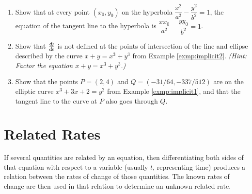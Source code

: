 {\begin{enumerate}[\bfseries 1.]
 \item\label{exer:hyptan} Show that at every point $(x_0,y_0)$ on the hyperbola
  $\dfrac{x^2}{a^2} - \dfrac{y^2}{b^2} = 1$,
  the equation of the  tangent line to the hyperbola is
  $\dfrac{x x_0}{a^2} - \dfrac{y y_0}{b^2} = 1$.
 \item Show that $\frac{d\negmedspace y}{d\!x}$ is not defined at the points of intersection of the
  line and ellipse described by the curve $x+y=x^3+y^3$ from Example
  \ref{exmp:implicit2}. \emph{(Hint: Factor the equation $x+y=x^3+y^3$.)}
 \item Show that the points $P=(2,4)$ and $Q=(-31/64,-337/512)$ are on the
  elliptic curve $x^3+3x+2=y^2$ from Example \ref{exmp:implicit1}, and that the
  tangent line to the curve at $P$ also goes through $Q$.
\end{enumerate}
}
\newpage
\section{Related Rates}
If several quantities are related by an equation, then differentiating both
sides of that equation with respect to a variable (usually $t$, representing
time) produces a relation between the rates of change of those quantities.
The known rates of change are then used in that relation to determine an
unknown related rate.

